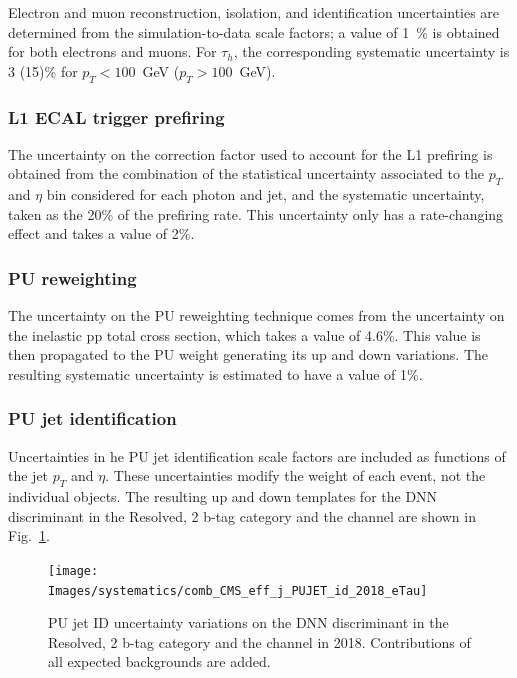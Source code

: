 \documentclass[../main.tex]{subfiles}
\begin{document}
Electron and muon reconstruction, isolation, and identification uncertainties are determined 
from the simulation-to-data scale factors; a value of 1~\% is obtained for both electrons and muons. For $\tau_h$, the corresponding systematic uncertainty is 3 (15)\% for $p_T<100$~GeV ($p_T>100$~GeV).

\subsubsection*{L1 ECAL trigger prefiring}

The uncertainty on the correction factor used to account for the L1 prefiring is obtained from the combination of the statistical uncertainty associated to the $p_T$ and $\eta$ bin considered for each photon and jet, and the systematic uncertainty, taken as the 20\% of the prefiring rate. This uncertainty only has a rate-changing effect and takes a value of 2\%. 

\subsubsection*{PU reweighting}

The uncertainty on the PU reweighting technique comes from the uncertainty on the inelastic pp total cross section, which takes a value of 4.6\%. This value is then propagated to the PU weight generating its up and down variations. The resulting systematic uncertainty is estimated to have a value of 1\%.

\subsubsection{PU jet identification}

Uncertainties in he PU jet identification scale factors are included as functions of the jet $p_T$ and $\eta$. These uncertainties modify the weight of each event, not the individual objects. The resulting up and down templates for the DNN discriminant in the Resolved, 2 b-tag category and the \tauh\tauh{} channel are shown in Fig.~\ref{hh:fig:pujet_syst}.

\begin{figure}[h!]
\begin{center}
\texttt{[image: Images/systematics/comb\_CMS\_eff\_j\_PUJET\_id\_2018\_eTau]}
\end{center}
\caption[PU jet ID uncertainty]{PU jet ID uncertainty variations on the DNN discriminant in the Resolved, 2 b-tag category and the \tauh\tauh{} channel in 2018. Contributions of all expected backgrounds are added.}
\label{hh:fig:pujet_syst}
\end{figure}
\end{document}
